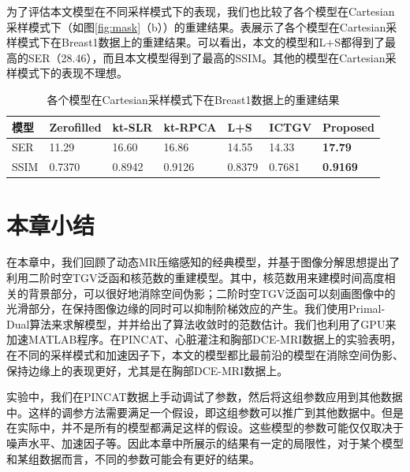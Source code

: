 为了评估本文模型在不同采样模式下的表现，我们也比较了各个模型在Cartesian采样模式下（如图\ref{fig:mask}（b））的重建结果。表\label{tab:cartesian}展示了各个模型在Cartesian采样模式下在Breast1数据上的重建结果。可以看出，本文的模型和L+S都得到了最高的SER（28.46），而且本文模型得到了最高的SSIM。其他的模型在Cartesian采样模式下的表现不理想。
\begin{table}
\centering
\caption{各个模型在Cartesian采样模式下在Breast1数据上的重建结果}
\begin{center}
\begin{tabular}{|l|l|l|l|l|l|l|}
\hline
\hline
模型 & Zerofilled & kt-SLR & kt-RPCA & L+S & ICTGV & Proposed \\
\hline
SER & 11.29 & 16.60 & 16.86 & 14.55 & 14.33 & \textbf{17.79} \\
\hline
SSIM & 0.7370 & 0.8942 & 0.9126 & 0.8379 & 0.7681 & \textbf{0.9169}\\
\hline
\end{tabular}
\end{center}
\label{tab:cartesian}
\end{table}

\section{本章小结}
在本章中，我们回顾了动态MR压缩感知的经典模型，并基于图像分解思想提出了利用二阶时空TGV泛函和核范数的重建模型。其中，核范数用来建模时间高度相关的背景部分，可以很好地消除空间伪影；二阶时空TGV泛函可以刻画图像中的光滑部分，在保持图像边缘的同时可以抑制阶梯效应的产生。我们使用Primal-Dual算法来求解模型，并并给出了算法收敛时的范数估计。我们也利用了GPU来加速MATLAB程序。在PINCAT、心脏灌注和胸部DCE-MRI数据上的实验表明，在不同的采样模式和加速因子下，本文的模型都比最前沿的模型在消除空间伪影、保持边缘上的表现更好，尤其是在胸部DCE-MRI数据上。

实验中，我们在PINCAT数据上手动调试了参数，然后将这组参数应用到其他数据中。这样的调参方法需要满足一个假设，即这组参数可以推广到其他数据中。但是在实际中，并不是所有的模型都满足这样的假设。这些模型的参数可能仅仅取决于噪声水平、加速因子等。因此本章中所展示的结果有一定的局限性，对于某个模型和某组数据而言，不同的参数可能会有更好的结果。

















